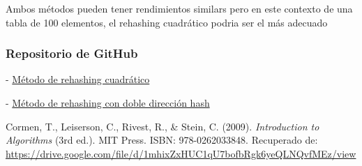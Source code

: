 \documentclass{scrreprt}
\begin{document}
Ambos métodos pueden tener rendimientos similars pero en este contexto de una tabla de 100 elementos, el rehashing cuadrático podria ser el más adecuado



\subsubsection{\textbf{Repositorio de GitHub}}

- \href{https://github.com/NejoBMG/TP3_EDA/blob/main/ArchivoDeEnterosC.java}{Método de rehashing cuadrático}


- \href{https://github.com/NejoBMG/TP3_EDA/blob/main/ArchivoDeEnterosR.java}{Método de rehashing con doble dirección hash}

\newpage
\begin{thebibliography}{9}
Cormen, T., Leiserson, C., Rivest, R., \& Stein, C. (2009). \textit{Introduction to Algorithms} (3rd ed.). MIT Press. ISBN: 978-0262033848. Recuperado de:
\url{https://drive.google.com/file/d/1mhixZxHUC1qU7bofbRgk6yeQLNQvfMEz/view}
\end{thebibliography}
\end{document}

